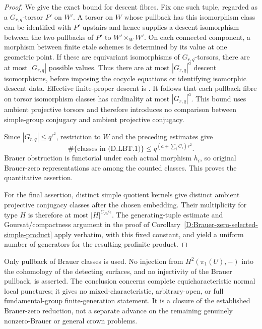 \begin{proof}
We give the exact bound for descent fibres. Fix one such
tuple, regarded as a $G_{r,q}$-torsor $P'$ on $W'$. A torsor
on $W$ whose pullback has this isomorphism class can be
identified with $P'$ upstairs and hence supplies a descent
isomorphism between the two pullbacks of $P'$ to
$W'\times_W W'$. On each connected component, a morphism
between finite etale schemes is determined by its value at
one geometric point. If these are equivariant isomorphisms
of $G_{r,q}$-torsors, there are at most $|G_{r,q}|$ possible
values. Thus there are at most $|G_{r,q}|^a$ descent
isomorphisms, before imposing the cocycle equations or
identifying isomorphic descent data. Effective finite-proper
descent is \citet[Expose IX, Theorem 4.7 and its proof]{C_SGA1}.
It follows that each pullback fibre on torsor isomorphism
classes has cardinality at most $|G_{r,q}|^a$.
This bound uses ambient projective torsors and therefore
introduces no comparison between simple-group conjugacy
and ambient projective conjugacy.

Since $|G_{r,q}|\le q^{r^2}$, restriction to $W$ and the
preceding estimates give
\[
        \#\{\text{classes in (D.LBT.1)}\}
              \le q^{(a+\sum_i C_i)r^2}.
\]
Brauer obstruction is functorial under each actual morphism
$h_i$, so original Brauer-zero representations are among
the counted classes. This proves the quantitative assertion.

For the final assertion, distinct simple quotient kernels
give distinct ambient projective conjugacy classes after
the chosen embedding. Their multiplicity for type $H$ is
therefore at most $|H|^{C_R/\epsilon}$. The generating-tuple
estimate and Goursat/compactness argument in the proof of
Corollary~\ref{D:Brauer-zero-selected-simple-product} apply
verbatim, with this fixed constant, and yield a uniform
number of generators for the resulting profinite product.
\end{proof}

\begin{remark}
Only pullback of Brauer classes is used. No injection from
$H^2(\pi_1(U),-)$ into the cohomology of the detecting
surfaces, and no injectivity of the Brauer pullback, is
asserted. The conclusion concerns complete equicharacteristic
normal local punctures; it gives no mixed-characteristic,
arbitrary-open, or full fundamental-group finite-generation
statement. It is a closure of the established Brauer-zero
reduction, not a separate advance on the remaining genuinely
nonzero-Brauer or general crown problems.
\end{remark}
